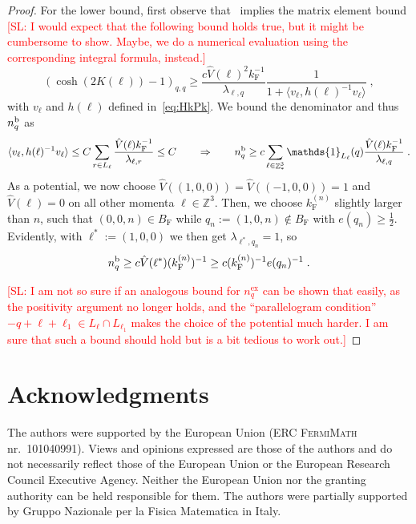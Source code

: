 \documentclass[12pt,a4paper]{article}
\numberwithin{equation}{section}
\newcommand{\ZZZ}{\mathbb{Z}}
\newcommand{\1}{\mathbb{I}}
\renewcommand{\b}{\textnormal{b}}
\newcommand{\ex}{\mathrm{ex}}
\newcommand{\F}{\mathrm{F}}
\DeclareMathOperator{\Z}{\mathbb{Z}}
\newcommand{\half}{\frac{1}{2}}
\theoremstyle{plain}
\theoremstyle{definition}
\theoremstyle{remark}
\theoremstyle{plain}
\theoremstyle{definition}
\theoremstyle{remark}
\begin{document}
\begin{proof}
For the lower bound, first observe that~\cite[Prop.~7.8]{CHN21} implies the matrix element bound \textcolor{red}{[SL: I would expect that the following bound holds true, but it might be cumbersome to show. Maybe, we do a numerical evaluation using the corresponding integral formula, instead.]}
\begin{equation}
	(\cosh(2K(\ell)) - 1)_{q,q}
	\ge \frac{c \hat{V}(\ell)^2 k_{\F}^{-1}}{\lambda_{\ell,q}}
		\frac{1}{1 + \langle v_\ell, h(\ell)^{-1} v_\ell \rangle} \;,
\end{equation}
with $ v_\ell $ and $ h(\ell) $ defined in~\eqref{eq:HkPk}. We bound the denominator and thus $ n_q^{\b} $ as
\begin{equation}
	\langle v_\ell, h(\ell)^{-1} v_\ell \rangle \le C \sum_{r \in L_\ell} \frac{\hat{V}(\ell) k_{\F}^{-1}}{\lambda_{\ell,r}} \le C \qquad \Rightarrow \qquad
	n_q^{\b}
	\ge c \sum_{\ell \in \Z^3_*} \mathds{1}_{L_\ell}(q)
		\frac{\hat{V}(\ell) k_{\F}^{-1}}{\lambda_{\ell,q}} \;.
\end{equation}
As a potential, we now choose $ \hat{V}((1,0,0)) = \hat{V}((-1,0,0)) = 1 $ and $ \hat{V}(\ell) = 0 $ on all other momenta $ \ell \in \ZZZ^3 $. Then, we choose $ k_{\F}^{(n)} $ slightly larger than $ n $, such that $ (0,0,n) \in B_{\F} $ while $ q_n := (1,0,n) \notin B_{\F} $ with $ e(q_n) \ge \half $. Evidently, with $ \ell^* := (1,0,0) $ we then get $ \lambda_{\ell^*, q_n} = 1 $, so
\begin{equation}
	n_q^{\b}
	\ge c \hat{V}(\ell^*) (k_{\F}^{(n)})^{-1}
	\ge c (k_{\F}^{(n)})^{-1} e(q_n)^{-1} \;.
\end{equation}

\textcolor{red}{[SL: I am not so sure if an analogous bound for $ n_q^{\ex} $ can be shown that easily, as the positivity argument no longer holds, and the ``parallelogram condition'' $ -q+\ell+\ell_1 \in L_\ell \cap L_{\ell_1} $ makes the choice of the potential much harder. I am sure that such a bound should hold but is a bit tedious to work out.]}
\end{proof}






\section*{Acknowledgments}
The authors were supported by the European Union (ERC \textsc{FermiMath} nr.~101040991). Views and opinions expressed are those of the authors and do not necessarily reflect those of the European Union or the European Research Council Executive Agency. Neither the European Union nor the granting authority can be held responsible for them. The authors were partially supported by Gruppo Nazionale per la Fisica Matematica in Italy.
\end{document}
